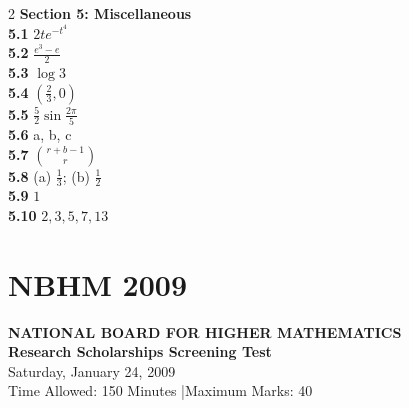 \documentclass[11pt,a4paper]{article}
\newcommand{\examheader}[4]{%
  \clearpage
  \section{#1}
  \begin{center}
    {\large\bfseries NATIONAL BOARD FOR HIGHER MATHEMATICS}\\[3pt]
    {\bfseries #2}\\[2pt]
    {#3}\\[2pt]
    {\small #4}
  \end{center}
  \vspace{4pt}
}
\begin{document}
\begin{multicols}{2}
\medskip
\textbf{Section 5: Miscellaneous}\\
\textbf{5.1} $2te^{-t^4}$\\
\textbf{5.2} $\frac{e^3 - e}{2}$\\
\textbf{5.3} $\log 3$\\
\textbf{5.4} $\left(\frac{2}{3}, 0\right)$\\
\textbf{5.5} $\frac{5}{2}\sin\frac{2\pi}{5}$\\
\textbf{5.6} a, b, c\\
\textbf{5.7} $\binom{r+b-1}{r}$\\
\textbf{5.8} (a) $\frac{1}{3}$; (b) $\frac{1}{2}$\\
\textbf{5.9} $1$\\
\textbf{5.10} $2, 3, 5, 7, 13$
\end{multicols}
\examheader{NBHM 2009}{Research Scholarships Screening Test}{Saturday, January 24, 2009}{Time Allowed: 150 Minutes \quad|\quad Maximum Marks: 40}
\end{document}
